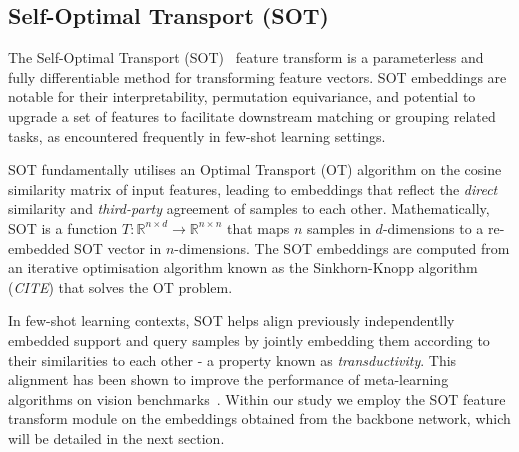 \subsection{Self-Optimal Transport (SOT)}


The Self-Optimal Transport (SOT)~\cite{sot} feature transform is a parameterless and fully differentiable method for transforming feature vectors. SOT embeddings are notable for their interpretability, permutation equivariance, and potential to upgrade a set of features to facilitate downstream matching or grouping related tasks, as encountered frequently in few-shot learning settings.

SOT fundamentally utilises an Optimal Transport (OT) algorithm on the cosine similarity matrix of input features, leading to embeddings that reflect the \textit{direct} similarity and \textit{third-party} agreement of samples to each other. Mathematically, SOT is a function \(T: \mathbb{R}^{n \times d} \rightarrow \mathbb{R}^{n \times n}\) that maps \(n\) samples in \(d\)-dimensions to a re-embedded SOT vector in \(n\)-dimensions. The SOT embeddings are computed from an iterative optimisation algorithm known as the Sinkhorn-Knopp algorithm (\textit{CITE}) that solves the OT problem.

In few-shot learning contexts, SOT helps align previously independentlly embedded support and query samples by jointly embedding them according to their similarities to each other - a property known as \textit{transductivity}. This alignment has been shown to improve the performance of meta-learning algorithms on vision benchmarks~\cite{sot}. Within our study we employ the SOT feature transform module on the embeddings obtained from the backbone network, which will be detailed in the next section.



